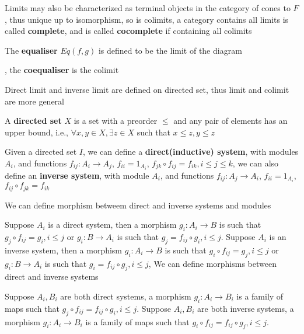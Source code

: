 \documentclass[main]{subfiles}
\begin{document}
\begin{definition}
\begin{center}
\end{center}
Limits may also be characterized as terminal objects in the category of cones to $F$, thus unique up to isomorphism, so is colimits, a category contains all limits is called \textbf{complete}, and is called \textbf{cocomplete} if containing all colimits \par
The \textbf{equaliser} $Eq(f,g)$ is defined to be the limit of the diagram , the \textbf{coequaliser} is the colimit
\end{definition}

\begin{remark}
Direct limit and inverse limit are defined on directed set, thus limit and colimit are more general
\end{remark}

\begin{definition}
A \textbf{directed set} $X$ is a set with a preorder $\leq$ and any pair of elements has an upper bound, i.e., $\forall x,y\in X,\exists z\in X$ such that $x\leq z,y\leq z$
\end{definition}

\begin{definition}
Given a directed set $I$, we can define a \textbf{direct(inductive) system}, with modules $A_i$, and functions $f_{ij}:A_i\to A_j$, $f_{ii}=1_{A_i}$, $f_{jk}\circ f_{ij}=f_{ik},i\leq j\leq k$, we can also define an \textbf{inverse system}, with module $A_i$, and functions $f_{ij}:A_j\to A_i$, $f_{ii}=1_{A_i}$, $f_{ij}\circ f_{jk}=f_{ik}$ \par
We can define morphism betweem direct and inverse systems and modules \par
Suppose $A_i$ is a direct system, then a morphism $g_i:A_i\to B$ is such that $g_j\circ f_{ij}=g_i,i\leq j$ or $g_i:B\to A_i$ is such that $g_j=f_{ij}\circ g_i,i\leq j$. Suppose $A_i$ is an inverse system, then a morphism $g_i:A_i\to B$ is such that $g_i\circ f_{ij}=g_j,i\leq j$ or $g_i:B\to A_i$ is such that $g_i=f_{ij}\circ g_j,i\leq j$, 
We can define morphisms between direct and inverse systems \par
Suppose $A_i,B_i$ are both direct systems, a morphism $g_i:A_i\to B_i$ is a family of maps such that $g_j\circ f_{ij}=f_{ij}\circ g_i,i\leq j$. Suppose $A_i,B_i$ are both inverse systems, a morphism $g_i:A_i\to B_i$ is a family of maps such that $g_i\circ f_{ij}=f_{ij}\circ g_j,i\leq j$. 
\end{definition}
\end{document}
